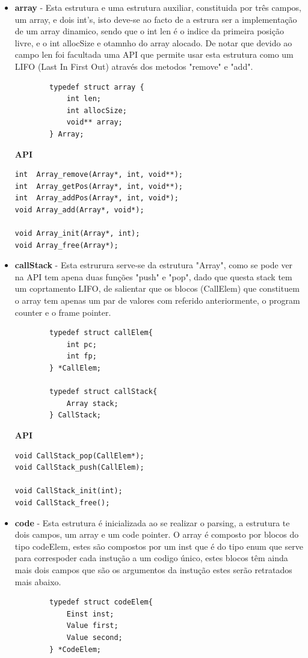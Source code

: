 \documentclass{report}
\begin{document}
\begin{itemize}
    \item \textbf{array} - Esta estrutura e uma estrutura auxiliar, constituida por três campos, um array, e dois int's, isto deve-se ao facto de a estrura ser a implementação de um array dinamico, sendo que o int len é o indice da primeira posição livre, e o int allocSize e otamnho do array alocado. De notar que devido ao campo len foi facultada uma API que permite usar esta estrutura como um LIFO (Last In First Out) através dos metodos "remove" e "add".
    \begin{verbatim}
        typedef struct array {
            int len;
            int allocSize;
            void** array;
        } Array;
    \end{verbatim}
        \textbf{API}
    \begin{verbatim}
int  Array_remove(Array*, int, void**);
int  Array_getPos(Array*, int, void**);
int  Array_addPos(Array*, int, void*);
void Array_add(Array*, void*);

void Array_init(Array*, int);
void Array_free(Array*);
  \end{verbatim}


    \item \textbf{callStack} - Esta estrurura serve-se da estrutura "Array", como se pode ver na API tem apena duas funções "push" e "pop", dado que questa stack tem um coprtamento LIFO, de salientar que os blocos (CallElem) que constituem o array tem apenas um par de valores com referido anteriormente, o program counter e o frame pointer.
	\begin{verbatim}
		typedef struct callElem{
		    int pc;
		    int fp;
		} *CallElem;

		typedef struct callStack{
		    Array stack;
		} CallStack;
    \end{verbatim}
        \textbf{API}
	\begin{verbatim}
void CallStack_pop(CallElem*);
void CallStack_push(CallElem);

void CallStack_init(int);
void CallStack_free();
  \end{verbatim}


	\item \textbf{code} - Esta estrutura é inicializada ao se realizar o parsing, a estrutura te dois campos, um array e um code pointer. O array é composto por blocos do tipo codeElem, estes são compostos por um inst que é do tipo enum que serve para correspoder cada instução a um codigo único, estes blocos têm ainda mais dois campos que são os argumentos da instução estes serão retratados mais abaixo.
	\begin{verbatim}
		typedef struct codeElem{
		    Einst inst;
		    Value first;
		    Value second;
		} *CodeElem;


\end{verbatim}
\end{itemize}
\end{document}
